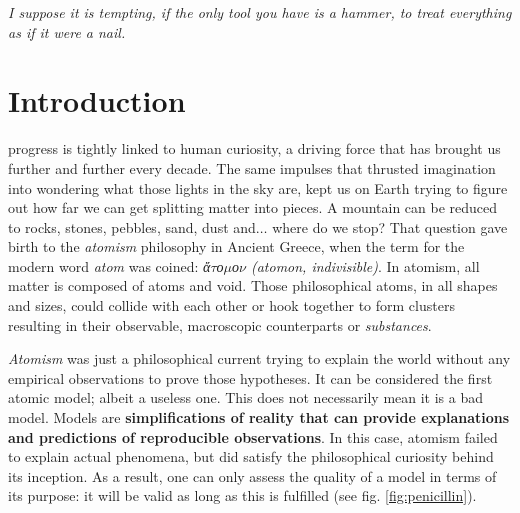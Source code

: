 
\begin{savequote}[0.6\textwidth]
	\itshape I suppose it is tempting, if the only tool you have is a hammer, to treat everything as if it were a nail.
\end{savequote}

\chapter{Introduction}
\label{chap:01}

 progress is tightly linked to human curiosity, a driving force that has brought us further and further every decade. The same impulses that thrusted imagination into wondering what those lights in the sky are, kept us on Earth trying to figure out how far we can get splitting matter into pieces. A mountain can be reduced to rocks, stones, pebbles, sand, dust and$ \ldots $  where do we stop? That question gave birth to the \textit{atomism} philosophy in Ancient Greece, when the term for the modern word \textit{atom} was coined: \textit{ἄ$\tau$ο$\mu$ο$\nu$ (atomon, indivisible)}. In atomism, all matter is composed of atoms and void. Those philosophical atoms, in all shapes and sizes, could collide with each other or hook together to form clusters resulting in their observable, macroscopic counterparts or \textit{substances}.

\textit{Atomism} was just a philosophical current trying to explain the world without any empirical observations to prove those hypotheses. It can be considered the first atomic model; albeit a useless one. This does not necessarily mean it is a bad model. Models are \textbf{simplifications of reality that can provide explanations and predictions of reproducible observations}. In this case, atomism failed to explain actual phenomena, but did satisfy the philosophical curiosity behind its inception. As a result, one can only assess the quality of a model in terms of its purpose: it will be valid as long as this is fulfilled (see fig. \ref{fig:penicillin}).



